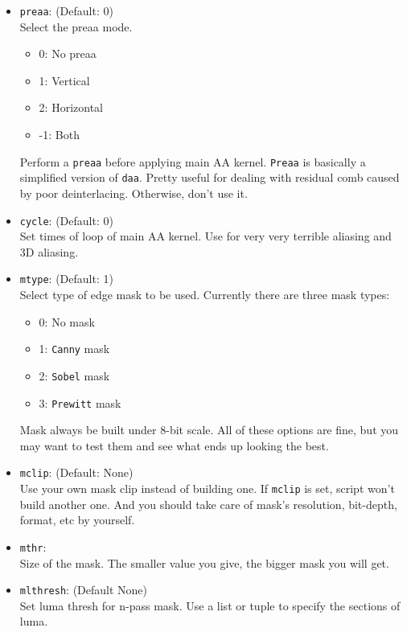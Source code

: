 \documentclass{scrartcl}
\begin{document}
\begin{itemize}
\item \texttt{preaa}: (Default: 0)\\
    Select the preaa mode.
    \begin{itemize}
    \item 0: No preaa
    \item 1: Vertical
    \item 2: Horizontal
    \item -1: Both
\end{itemize}
    Perform a \texttt{preaa} before applying main AA kernel. 
	\texttt{Preaa} is basically a simplified version of \texttt{daa}. 
	Pretty useful for dealing with residual comb caused by poor deinterlacing.  Otherwise, don't use it.

\item \texttt{cycle}: (Default: 0)\\
    Set times of loop of main AA kernel. 
    Use for very very terrible aliasing and 3D aliasing. 

\item \texttt{mtype}: (Default: 1) \\
    Select type of edge mask to be used. 
    Currently there are three mask types:
\begin{itemize}
    \item 0: No mask
    \item 1: \texttt{Canny} mask
    \item 2: \texttt{Sobel} mask
    \item 3: \texttt{Prewitt} mask
\end{itemize}
	Mask always be built under 8-bit scale.  All of these options are fine, but you may want to test them and see what ends up looking the best.

\item \texttt{mclip}: (Default: None)\\
    Use your own mask clip instead of building one. 
	If \texttt{mclip} is set, script won't build another one.  And you should take care of mask's resolution, bit-depth, format, etc by yourself. 

\item \texttt{mthr}: \\
    Size of the mask. 
    The smaller value you give, the bigger mask you will get. 

\item \texttt{mlthresh}: (Default None) \\
    Set luma thresh for n-pass mask. 
    Use a list or tuple to specify the sections of luma. 


\end{itemize}
\end{document}
